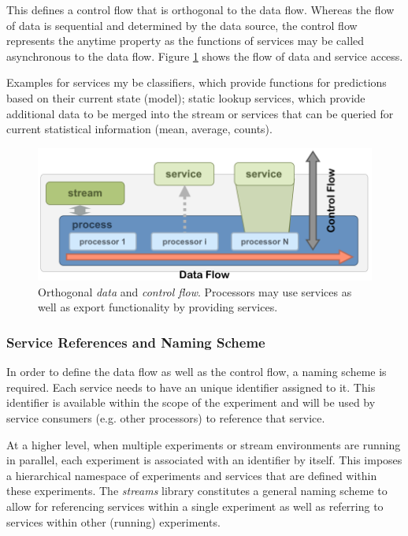 This defines a control flow that is orthogonal to the data flow. Whereas
the flow of data is sequential and determined by the data source, the
control flow represents the anytime property as the functions of services
may be called asynchronous to the data flow.
Figure \ref{fig:control} shows the flow of data and service access.

Examples for services my be classifiers, which provide functions for
predictions based on their current state (model); static lookup
services, which provide additional data to be merged into the stream
or services that can be queried for current statistical information
(mean, average, counts).

\begin{figure}[h!]
  \begin{center}
    \includegraphics[scale=0.35]{graphics/data-control-flow.png}
  \end{center}
  \caption{\label{fig:control}Orthogonal {\em data} and {\em control
      flow}. Processors may use services as well as export
    functionality by providing services.}
\end{figure}

\subsubsection*{Service References and Naming Scheme}
In order to define the data flow as well as the control flow, a naming
scheme is required. Each service needs to have an unique identifier assigned
to it. This identifier is available within the scope of the experiment and
will be used by service consumers (e.g. other processors) to reference that
service.

At a higher level, when multiple experiments or stream environments are running
in parallel, each experiment is associated with an identifier by itself. This
imposes a hierarchical namespace of experiments and services that are defined
within these experiments. The {\em streams} library constitutes a general
naming scheme to allow for referencing services within a single experiment
as well as referring to services within other (running) experiments.

